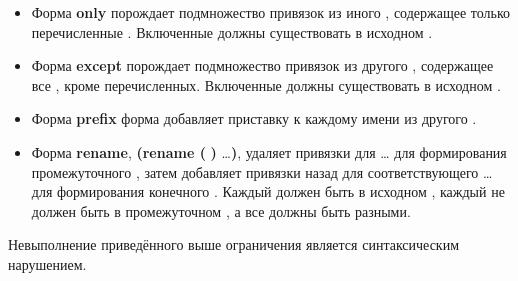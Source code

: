 \begin{itemize}
\item Форма {\cf\bfseries only} порождает подмножество привязок из иного ,
  содержащее только перечисленные . Включенные  должны
  существовать в исходном .
\newpage
\item Форма {\cf\bfseries except} порождает подмножество привязок из другого ,
  содержащее все , кроме перечисленных. Включенные  должны
  существовать в исходном .
\item Форма {\cf\bfseries prefix} форма добавляет приставку  к каждому
  имени из другого .
\item Форма {\cf\bfseries rename}, {\cf \textbf{(rename (}
  \textbf{)} \ldots\textbf{)}}, удаляет привязки для {\cf
   \ldots} для формирования промежуточного , затем
  добавляет привязки назад для соответствующего {\cf {} \ldots} для
  формирования конечного . Каждый  должен быть в исходном
  , каждый  не должен быть в промежуточном
  , а все  должны быть разными.
\end{itemize}
Невыполнение приведённого выше ограничения является синтаксическим нарушением.\vspace{1mm}

